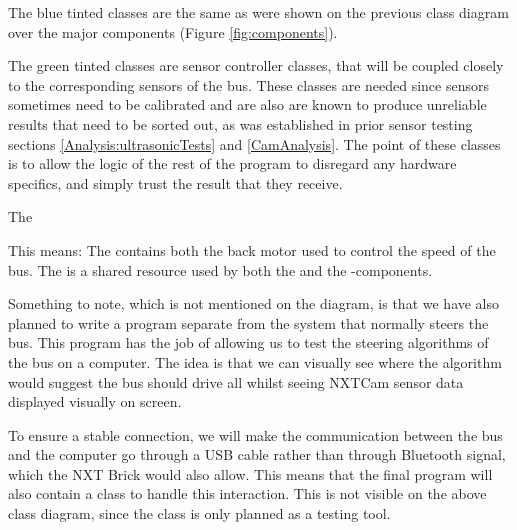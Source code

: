 The blue tinted classes are the same as were shown on the previous class diagram over the major components (Figure \ref{fig:components}). 

The green tinted classes are sensor controller classes, that will be coupled closely to the corresponding sensors of the bus. These classes are needed since sensors sometimes need to be calibrated and are also are known to produce unreliable results that need to be sorted out, as was established in prior sensor testing sections \ref{Analysis:ultrasonicTests} and \ref{CamAnalysis}. The point of these classes is to allow the logic of the rest of the program to disregard any hardware specifics, and simply trust the result that they receive. 

The 

This means:
The  contains both the back motor used to control the speed of the bus. The  is a shared resource used by both the  and the -components.



Something to note, which is not mentioned on the diagram, is that we have also planned to write a program separate from the system that normally steers the bus. This program has the job of allowing us to test the steering algorithms of the bus on a computer. The idea is that we can visually see where the algorithm would suggest the bus should drive all whilst seeing NXTCam sensor data displayed visually on screen. 

To ensure a stable connection, we will make the communication between the bus and the computer go through a USB cable rather than through Bluetooth signal, which the NXT Brick would also allow. This means that the final program will also contain a  class to handle this interaction. This is not visible on the above class diagram, since the class is only planned as a testing tool.